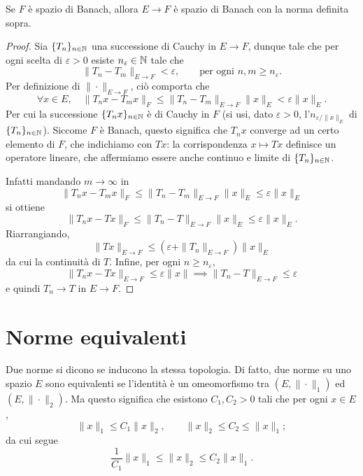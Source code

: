 \begin{lemma}
	Se $F$ è spazio di Banach, allora $E \to F$ è spazio di Banach con la norma definita sopra.
\end{lemma}
\begin{proof}
	Sia $\{T_n\}_{n \in \mathbb{N}}$ una successione di Cauchy in $E \to F$, dunque tale che per ogni scelta di $\varepsilon > 0$ esiste $n_\varepsilon \in \mathbb{N}$ tale che
	\begin{equation*}
		\|T_n - T_m\|_{E \to F} < \varepsilon, \qquad \text{per ogni $n , m \geq n_\varepsilon$}.
	\end{equation*}
	Per definizione di $\|\cdot\|_{E \to F}$, ciò comporta che
	\begin{equation*}
		\forall x \in E, \quad \|T_nx - T_mx\|_F \leq \|T_n - T_m\|_{E \to F}\|x\|_E < \varepsilon\|x\|_E.
	\end{equation*}
	Per cui la successione $\{T_nx\}_{n \in \mathbb{N}}$ è di Cauchy in $F$ (si usi, dato $\varepsilon > 0$, l'$n_{\varepsilon/\|x\|_E}$ di $\{T_n\}_{n \in \mathbb{N}}$).
	Siccome $F$ è Banach, questo significa che $T_n x$ converge ad un certo elemento di $F$, che indichiamo con $Tx$: la corrispondenza $x \mapsto Tx$ definisce un operatore lineare, che affermiamo essere anche continuo e limite di $\{T_n\}_{n \in \mathbb{N}}$.

	Infatti mandando $m \to \infty$ in
	\begin{equation*}
		\|T_nx - T_m x \|_F \leq \|T_n - T_m\|_{E \to F}\|x\|_E \leq \varepsilon \|x\|_E
	\end{equation*}
	si ottiene
	\begin{equation*}
		\|T_n x - T x\|_F \leq \|T_n - T\|_{E \to F}\|x\|_E \leq \varepsilon \|x\|_E.
	\end{equation*}
	Riarrangiando,
	\begin{equation*}
		\|Tx\|_{E \to F} \leq (\varepsilon + \|T_n\|_{E \to F})\|x\|_E
	\end{equation*}
	da cui la continuità di $T$. Infine, per ogni $n \geq n_\varepsilon$,
	\begin{equation*}
		\|T_n x - Tx\|_{E \to F} \leq \varepsilon\|x\| \implies \|T_n - T\|_{E \to F} \leq \varepsilon
	\end{equation*}
	e quindi $T_n \to T$ in $E \to F$.
\end{proof}

\section{Norme equivalenti}
Due norme si dicono  se inducono la stessa topologia. Di fatto, due norme su uno spazio $E$ sono equivalenti se l'identità è un omeomorfismo tra $(E, \|\cdot\|_1)$ ed $(E, \|\cdot\|_2)$. Ma questo significa che esistono $C_1, C_2 > 0$ tali che per ogni $x \in E$,
\begin{equation*}
	\|x\|_1 \leq C_1 \|x\|_2, \qquad \|x\|_2 \leq C_2 \leq \|x\|_1;
\end{equation*}
da cui segue
\begin{equation*}
	\frac1{C_1}\|x\|_1 \leq \|x\|_2 \leq C_2 \|x\|_1.
\end{equation*}

